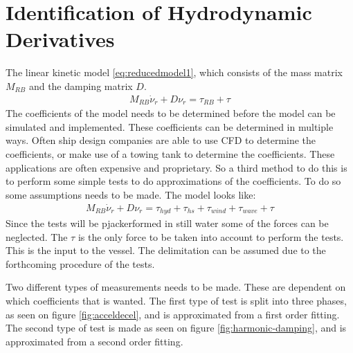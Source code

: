 \section{Identification of Hydrodynamic Derivatives}
\label{sec:hydrocoeff}
The linear kinetic model \eqref{eq:reducedmodel1}, which consists of the mass matrix $M_{RB}$ and the damping matrix $D$.
\begin{align}
M_{RB} \dot \nu_r + D\nu_r = \tau_{RB} + \tau
\label{eq:reducedmodel1}
\end{align}
The coefficients of the model needs to be determined before the model can be simulated and implemented. These coefficients can be determined in multiple ways. Often ship design companies are able to use \ac{CFD} to determine the coefficients, or make use of a towing tank to determine the coefficients. These applications are often expensive and proprietary. So a third method to do this is to perform some simple tests to do approximations of the coefficients. To do so some assumptions needs to be made. The model looks like:
\begin{align}
M_{RB} \dot \nu_r + D\nu_r = \tau_{hyd} + \tau_{hs} + \tau_{wind} + \tau_{wave} + \tau
\end{align}
Since the tests will be pjackerformed in still water some of the forces can be neglected. The $\tau$ is the only force to be taken into account to perform the tests. This is the input to the vessel. The delimitation can be assumed due to the forthcoming procedure of the tests.

Two different types of measurements needs to be made. These are dependent on which coefficients that is wanted. The first type of test is split into three phases, as seen on figure \ref{fig:acceldecel}, and is approximated from a first order fitting. The second type of test is made as seen on figure \ref{fig:harmonic-damping}, and is approximated from a second order fitting.

